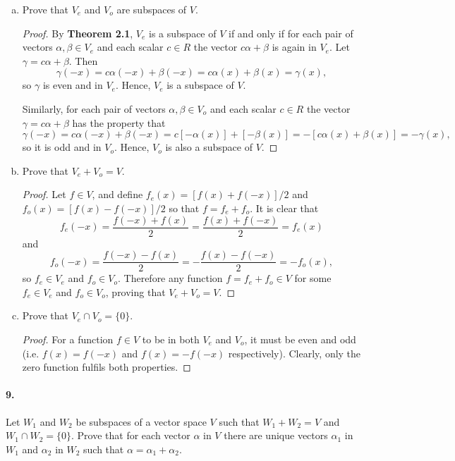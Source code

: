 \documentclass{article}
\begin{document}
\begin{enumerate}[(a)]
  \item Prove that $V_e$ and $V_o$ are subspaces of $V$.

    \begin{proof}
      By \textbf{Theorem 2.1}, $V_e$ is a subspace of $V$ if and only if for
      each pair of vectors $\alpha, \beta \in V_e$ and each scalar $c \in R$
      the vector $c\alpha + \beta$ is again in $V_e$. Let $\gamma = c\alpha + 
      \beta$. Then \[
        \gamma(-x) = c\alpha(-x) + \beta(-x) = c\alpha(x) + \beta(x) =
        \gamma(x),
      \] so $\gamma$ is even and in $V_e$. Hence, $V_e$ is a subspace of $V$.

      Similarly, for each pair of vectors $\alpha, \beta \in V_o$ and each
      scalar $c \in R$ the vector $\gamma = c\alpha + \beta$ has the property
      that \[
        \gamma(-x) = c\alpha(-x) + \beta(-x) = c[-\alpha(x)] + [-\beta(x)] =
        -[c\alpha(x) + \beta(x)] = -\gamma(x),
      \] so it is odd and in $V_o$. Hence, $V_o$ is also a subspace of $V$.
    \end{proof}
  \item Prove that $V_e + V_o = V$.

    \begin{proof}
      Let $f \in V$, and define $f_e(x) = [f(x) + f(-x)]/2$ and $f_o(x) =
      [f(x) - f(-x)]/2$ so that $f = f_e + f_o$. It is clear that \[
        f_e(-x) = \frac{f(-x) + f(x)}{2} = \frac{f(x) + f(-x)}{2} = f_e(x)
      \] and \[
        f_o(-x) = \frac{f(-x) - f(x)}{2} = -\frac{f(x) - f(-x)}{2} = -f_o(x),
      \] so $f_e \in V_e$ and $f_o \in V_o$. Therefore any function $f = f_e +
      f_o \in V$ for some $f_e \in V_e$ and $f_o \in V_o$, proving that $V_e +
      V_o = V$.
    \end{proof}
  \item Prove that $V_e \cap V_o = \{0\}$.

    \begin{proof}
      For a function $f \in V$ to be in both $V_e$ and $V_o$, it must be even
      and odd (i.e. $f(x) = f(-x)$ and $f(x) = -f(-x)$ respectively). Clearly,
      only the zero function fulfils both properties.
    \end{proof}
\end{enumerate}

\paragraph{9.} Let $W_1$ and $W_2$ be subspaces of a vector space $V$ such that
$W_1 + W_2 = V$ and $W_1 \cap W_2 = \{0\}$. Prove that for each vector $\alpha$
in $V$ there are unique vectors $\alpha_1$ in $W_1$ and $\alpha_2$ in $W_2$ such
that $\alpha = \alpha_1 + \alpha_2$.
\end{document}
